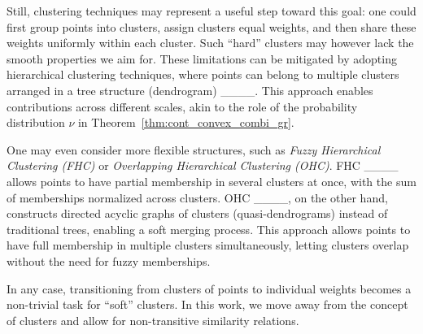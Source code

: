 Still, clustering techniques may represent a useful step toward this goal: one could first group points into clusters, assign clusters equal weights, and then share these weights uniformly within each cluster.
Such ``hard'' clusters may however lack the smooth properties we aim for. These limitations can be mitigated by adopting hierarchical clustering techniques, where points can belong to multiple clusters arranged in a tree structure (dendrogram) ____. This approach enables contributions across different scales, akin to the role of the probability distribution $\nu$  in Theorem~\ref{thm:cont_convex_combi_gr}.

One may even consider more flexible structures, such as \emph{Fuzzy Hierarchical Clustering (FHC)} or \emph{Overlapping Hierarchical Clustering (OHC)}. 
FHC ____ 
allows points to have partial membership in several clusters at once, with the sum of memberships normalized across clusters. 
OHC ____, on the other hand, constructs directed acyclic graphs of clusters (quasi-dendrograms) instead of traditional trees, enabling a soft merging process. This approach allows points to have full membership in multiple clusters simultaneously, letting clusters overlap without the need for fuzzy memberships.

In any case, transitioning from clusters of points to individual weights becomes a non-trivial task for ``soft'' clusters. In this work, we move away from the concept of clusters and allow for non-transitive similarity relations.